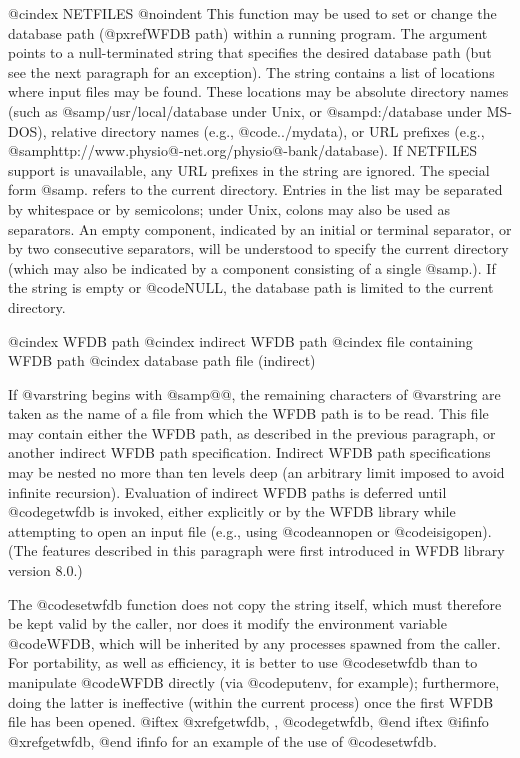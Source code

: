 {{{{{{{{{@cindex NETFILES
@noindent
This function may be used to set or change the database path
(@pxref{WFDB path}) within a running program.  The argument points to a
null-terminated string that specifies the desired database path (but see
the next paragraph for an exception).  The string contains a list of
locations where input files may be found.  These locations may be
absolute directory names (such as @samp{/usr/local/database} under Unix,
or @samp{d:/database} under MS-DOS), relative directory names (e.g.,
@code{../mydata}), or URL prefixes (e.g.,
@samp{http://www.physio@-net.org/physio@-bank/database}).  If NETFILES
support is unavailable, any URL prefixes in the string are ignored.  The
special form @samp{.} refers to the current directory.  Entries in the
list may be separated by whitespace or by semicolons; under Unix, colons
may also be used as separators.  An empty component, indicated by an
initial or terminal separator, or by two consecutive separators, will be
understood to specify the current directory (which may also be indicated
by a component consisting of a single @samp{.}).  If the string is empty or
@code{NULL}, the database path is limited to the current directory.

@cindex WFDB path
@cindex indirect WFDB path
@cindex file containing WFDB path
@cindex database path file (indirect)

If @var{string} begins with @samp{@@}, the remaining characters of
@var{string} are taken as the name of a file from which the WFDB path is
to be read.  This file may contain either the WFDB path, as described in
the previous paragraph, or another indirect WFDB path specification.
Indirect WFDB path specifications may be nested no more than ten levels
deep (an arbitrary limit imposed to avoid infinite recursion).
Evaluation of indirect WFDB paths is deferred until @code{getwfdb} is
invoked, either explicitly or by the WFDB library while attempting to open
an input file (e.g., using @code{annopen} or @code{isigopen}).  (The
features described in this paragraph were first introduced in WFDB library
version 8.0.)

The @code{setwfdb} function does not copy the string itself, which must
therefore be kept valid by the caller, nor does it modify the environment
variable @code{WFDB}, which will be inherited by any processes spawned
from the caller.  For portability, as well as efficiency, it is better
to use @code{setwfdb} than to manipulate @code{WFDB} directly (via
@code{putenv}, for example); furthermore, doing the latter is
ineffective (within the current process) once the first WFDB file has been
opened.
@iftex
@xref{getwfdb, , @code{getwfdb}},
@end iftex
@ifinfo
@xref{getwfdb},
@end ifinfo
for an example of the use of @code{setwfdb}.

}}}}}}}}}
